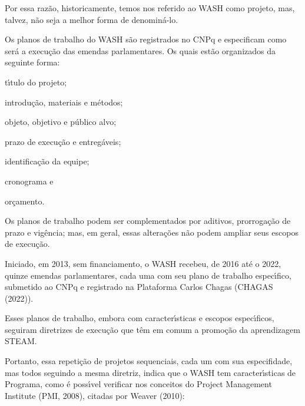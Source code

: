 \documentclass[
12pt,		%
openright,	%
twoside,  %
a4paper,			%
chapter=TITLE,		%
english,			%
french,				%
spanish,			%
brazil				%
]{USPSC-classe/USPSC}
\begin{document}
Por essa raz\~ao, historicamente, temos nos referido ao WASH como projeto, mas, talvez, n\~ao seja a melhor forma de denomin\'a-lo.








Os planos de trabalho do WASH s\~ao registrados no CNPq e especificam como ser\'a a execu\c{c}\~ao das emendas parlamentares. Os quais est\~ao organizados da seguinte forma:









\begin{alineas}
\item t\'{\i}tulo do projeto;
\item introdu\c{c}\~ao, materiais e m\'etodos;
\item objeto, objetivo e p\'ublico alvo;
\item prazo de execu\c{c}\~ao e entreg\'aveis;
\item identifica\c{c}\~ao da equipe;
\item cronograma e
\item or\c{c}amento.
\end{alineas}

Os planos de trabalho podem ser complementados por aditivos, prorroga\c{c}\~ao de prazo e vig\^encia; mas, em geral, essas altera\c{c}\~oes n\~ao podem ampliar seus escopos de execu\c{c}\~ao.








Iniciado, em 2013, sem financiamento, o WASH recebeu, de 2016 at\'e o 2022, quinze emendas parlamentares, cada uma com seu plano de trabalho espec\'{\i}fico, submetido ao CNPq e registrado na Plataforma Carlos Chagas (CHAGAS (2022)).








Esses planos de trabalho, embora com caracter\'{\i}sticas e escopos espec\'{\i}ficos, seguiram diretrizes de execu\c{c}\~ao que t\^em em comum a promo\c{c}\~ao da aprendizagem STEAM.








Portanto, essa repeti\c{c}\~ao de projetos sequenciais, cada um com sua especifidade, mas todos seguindo a mesma diretriz, indica que o WASH tem caracter\'{\i}sticas de Programa, como \'e poss\'{\i}vel verificar nos conceitos do Project Management Institute  (PMI, 2008), citadas por  Weaver (2010):
\end{document}
